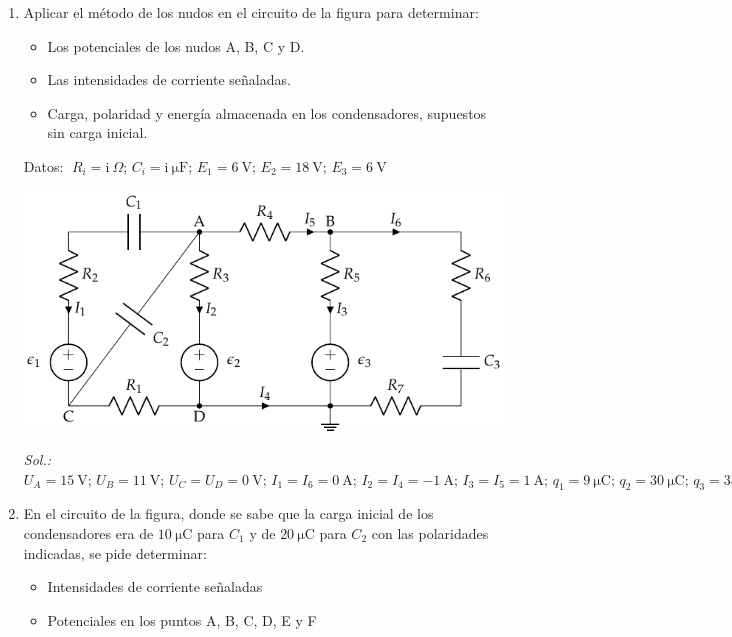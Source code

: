 \begin{enumerate}
  \emph{Sol.:\;
    $I_1=I_2=I_3=-I_4=\qty{1}{\ampere};\,  I_5=I_6=I_7=\qty{0}{\ampere};\, Q_{1\si{\micro\farad}}=\qty{-7}{\micro\coulomb};\, Q_{2\si{\micro\farad}}=\qty{-4}{\micro\coulomb};\, Q_{3\si{\micro\farad}}=\qty{3}{\micro\coulomb};\, E_{1\si{\micro\farad}}=\qty{24.5}{\micro\joule};\, E_{2\si{\micro\farad}}=\qty{4}{\micro\joule};\, E_{3\si{\micro\farad}}=\qty{1.5}{\micro\joule}$}

\item Aplicar el método de los nudos en el circuito de la figura para
  determinar:
  \begin{itemize}
  \item Los potenciales de los nudos A, B, C y D.
  \item Las intensidades de corriente señaladas.
  \item Carga, polaridad y energía almacenada en los condensadores,
    supuestos sin carga inicial.
  \end{itemize}
  Datos:
  $\; R_i = \mathrm{i\ } \Omega;\, C_i = \mathrm{i\ } \si{\micro\farad};\, E_1 = \qty{6}{\volt};\, E_2
  = \qty{18}{\volt};\, E_3 = \qty{6}{\volt}$
  \begin{center}
    \includegraphics[]{../figs/nudos_condensadores.pdf}
  \end{center}

  \emph{Sol.:\;
    $U_A=\qty{15}{\volt};\, U_B=\qty{11}{\volt};\, U_C=U_D=\qty{0}{\volt};\, I_1=I_6=\qty{0}{\ampere};\, I_2=I_4=\qty{-1}{\ampere};\, I_3=I_5=\qty{1}{\ampere};\,
    q_1=\qty{9}{\micro\coulomb};\, q_2=\qty{30}{\micro\coulomb};\, q_3=\qty{33}{\micro\coulomb};\, E_{C1}=\qty{40.5}{\micro\joule};\,
    E_{C2}=\qty{225}{\micro\joule};\, E_{C2}=\qty{181.5}{\micro\joule}$}

\item En el circuito de la figura, donde se sabe
  que la carga inicial de los condensadores era de
  $\qty{10}{\micro\coulomb}$ para $C_1$ y de
  $\qty{20}{\micro\coulomb}$ para $C_2$ con las polaridades indicadas,
  se pide determinar:
  \begin{itemize}
  \item Intensidades de corriente señaladas
  \item Potenciales en los puntos A, B, C, D, E y F
  \end{itemize}


\end{enumerate}
